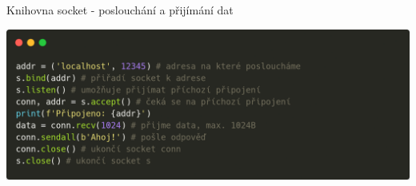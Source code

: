 \documentclass{beamer}
\begin{document}
\begin{frame}{Knihovna socket - poslouchání  a přijímání dat}
    \begin{center}
        \includegraphics[width=\textwidth]{obrazky/codes/carbon12.png}
    \end{center}
\end{frame}
\end{document}
